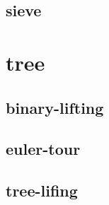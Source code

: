 \documentclass[a4paper, twocolumn]{article}
\begin{document}
\subsection{sieve}

\section{tree}
\subsection{binary-lifting}

\subsection{euler-tour}

\subsection{tree-lifing}

\end{document}

